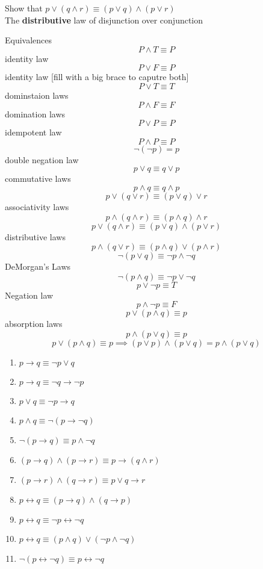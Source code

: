 \documentclass[a4paper, 12pt]{article}
\newenvironment{example}[1][Example]{\begin{trivlist}
\item[\hskip \labelsep {\bfseries #1}]}{\end{trivlist}}
\newcommand{\keyword}[1]{\textbf{#1}}
\begin{document}
    \begin{example}
        Show that $p \vee (q \wedge r) \equiv (p \vee q) \wedge (p \vee r)$\\
        The \keyword{distributive} law of disjunction over conjunction
    \end{example}
    Equivalences
    \[ P \wedge T \equiv P \] identity law
    \[ P \vee F \equiv P \] identity law [fill with a big brace to caputre both]
    \[ P \vee T \equiv T \] dominstaion laws
    \[ P \wedge F \equiv F \] domination laws
    \[ P \vee P \equiv P \] idempotent law
    \[ P \wedge P \equiv P \]
    \[ \neg (\neg p) = p \] double negation law
    \[ p \vee q \equiv q \vee p \] commutative laws
    \[ p \wedge q \equiv q \wedge p \]
    \[ p \vee (q \vee r) \equiv (p \vee q) \vee r \] associativity laws
    \[ p \wedge (q \wedge r) \equiv (p \wedge q) \wedge r \]
    \[ p \vee (q \wedge r) \equiv (p \vee q) \wedge (p \vee r) \] distributive laws
    \[ p \wedge (q \vee r) \equiv (p \wedge q) \vee (p \wedge r) \]
    \[ \neg (p \vee q) \equiv \neg p \wedge \neg q \] DeMorgan's Laws
    \[ \neg (p \wedge q) \equiv \neg p \vee \neg q \]
    \[ p \vee \neg p \equiv T \] Negation law
    \[ p \wedge \neg p \equiv F \]
    \[ p \vee (p \wedge q) \equiv p \] absorption laws
    \[ p \wedge (p \vee q) \equiv p \]
    \[ p \vee (p \wedge q) \equiv p \implies (p \vee p) \wedge (p \vee q)
    = p \wedge (p \vee q) \]
    \begin{enumerate}
        \item $p \rightarrow q \equiv \neg p \vee q$
        \item $p \rightarrow q \equiv \neg q \rightarrow \neg p$
        \item $p \vee q \equiv \neg p \rightarrow q$
        \item $p \wedge q \equiv \neg (p \rightarrow \neg q)$
        \item $\neg (p \rightarrow q) \equiv p \wedge \neg q$
        \item $(p \rightarrow q) \wedge (p \rightarrow r) \equiv
        p \rightarrow (q \wedge r)$
        \item $(p \rightarrow r) \wedge (q \rightarrow r) \equiv
        p \vee q \rightarrow r$
        \item $p \leftrightarrow q \equiv (p \rightarrow q)
        \wedge (q \rightarrow p)$
        \item $p \leftrightarrow q \equiv \neg p \leftrightarrow
        \neg q$
        \item $p \leftrightarrow q \equiv (p \wedge q) \vee
        (\neg p \wedge \neg q)$
        \item $\neg (p \leftrightarrow \neg q) \equiv p
        \leftrightarrow \neg q$
    \end{enumerate}
\end{document}
